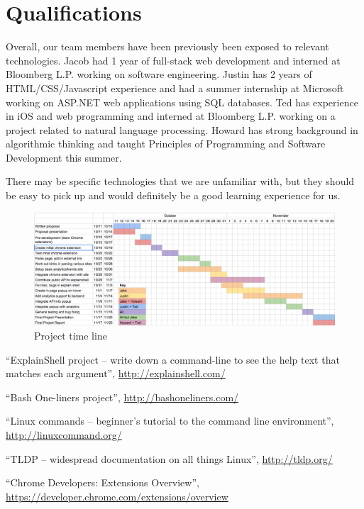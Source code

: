 \documentclass[11pt]{article}
\begin{document}
\section{Qualifications}

Overall, our team members have been previously been exposed to relevant technologies. Jacob had 1 year of full-stack web development and interned at Bloomberg L.P. working on software engineering. Justin has 2 years of HTML/CSS/Javascript experience and had a summer internship at Microsoft working on ASP.NET web applications using SQL databases. Ted has experience in iOS and web programming and interned at Bloomberg L.P. working on a project related to natural language processing. Howard has strong background in algorithmic thinking and taught Principles of Programming and Software Development this summer. 

There may be specific technologies that we are unfamiliar with, but they should be easy to pick up and would definitely be a good learning experience for us.

\begin{landscape}
\thispagestyle{empty}
\begin{figure}[htb]
\vspace*{6em}
\hspace*{-3em}
\centering
\includegraphics[width=1.5\textwidth]{gantt-chart.png}
\caption{Project time line\label{fig:timetable}}
\end{figure}
\end{landscape}

\begin{thebibliography}{9}

  ``ExplainShell project -- write down a command-line to see the help text that 
  matches each argument'',
  \url{http://explainshell.com/}

  ``Bash One-liners project'',
  \url{http://bashoneliners.com/}

  ``Linux commands -- beginner's tutorial to the command line environment'',
  \url{http://linuxcommand.org/}

  ``TLDP -- widespread documentation on all things Linux'',
  \url{http://tldp.org/}

  ``Chrome Developers: Extensions Overview'',
  \url{https://developer.chrome.com/extensions/overview}

\end{thebibliography}
\end{document}

